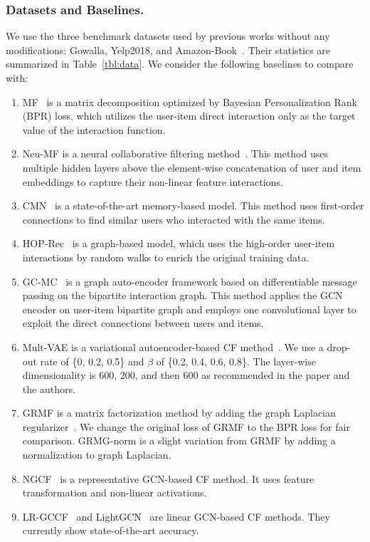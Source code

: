 \documentclass[sigconf]{acmart}
\begin{document}
\subsubsection{Datasets and Baselines.} We use the three benchmark datasets used by previous works without any modifications: Gowalla, Yelp2018, and Amazon-Book~\cite{10.1145/3331184.3331267,Chen_Wu_Hong_Zhang_Wang_2020,10.1145/3397271.3401063}. Their statistics are summarized in Table~\ref{tbl:data}. We consider the following baselines to compare with:
\begin{enumerate}
    \item MF~\cite{10.5555/1795114.1795167} is a matrix decomposition optimized by Bayesian Personalization Rank (BPR) loss, which utilizes the user-item direct interaction only as the target value of the interaction function.
    \item Neu-MF is a neural collaborative filtering method~\cite{He2017}. This method uses multiple hidden layers above the element-wise concatenation of user and item embeddings to capture their non-linear feature interactions.
    \item CMN~\cite{Ebesu2018} is a state-of-the-art memory-based model. This method uses first-order connections to find similar users who interacted with the same items.
    \item HOP-Rec~\cite{yang2018hop} is a graph-based model, which uses the high-order user-item interactions by random walks to enrich the original training data.
    \item GC-MC~\cite{DBLP:journals/corr/BergKW17} is a graph auto-encoder framework based on differentiable message passing on the bipartite interaction graph. This method applies the GCN encoder on user-item bipartite graph and employs one convolutional layer to exploit the direct connections between users and items.
    \item Mult-VAE is a variational autoencoder-based CF method~\cite{10.1145/3178876.3186150}. We use a drop-out rate of \{0, 0.2, 0.5\} and $\beta$ of \{0.2, 0.4, 0.6, 0.8\}. The layer-wise dimensionality is 600, 200, and then 600 as recommended in the paper and the authors.
    \item GRMF is a matrix factorization method by adding the graph Laplacian regularizer~\cite{NIPS2015_f4573fc7}. We change the original loss of GRMF to the BPR loss for fair comparison. GRMG-norm is a slight variation from GRMF by adding a normalization to graph Laplacian.
    \item NGCF~\cite{10.1145/3331184.3331267} is a representative GCN-based CF method. It uses feature transformation and non-linear activations.
    \item LR-GCCF~\cite{Chen_Wu_Hong_Zhang_Wang_2020} and LightGCN~\cite{10.1145/3397271.3401063} are linear GCN-based CF methods. They currently show state-of-the-art accuracy.
\end{enumerate}
\end{document}
